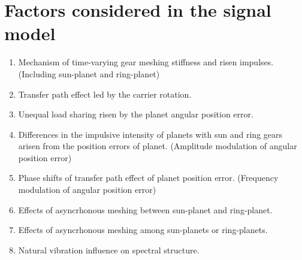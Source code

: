 \documentclass[a4paper,fleqn]{cas-sc}
\begin{document}
\section{Factors considered in the signal model}
\begin{enumerate}
    \item Mechanism of time-varying gear meshing stiffness and risen impulses. (Including sun-planet and ring-planet)
    \item Transfer path effect led by the carrier rotation.
    \item Unequal load sharing risen by the planet angular position error.
    \item Differences in the impulsive intensity of planets with sun and ring gears arisen from the position errors of planet. (Amplitude modulation of angular position error)
    \item Phase shifts of transfer path effect of planet position error. (Frequency modulation of angular position error)
    \item Effects of asyncrhonous meshing between sun-planet and ring-planet.
    \item Effects of asyncrhonous meshing among sun-planets or ring-planets.
    \item Natural vibration influence on spectral structure.
\end{enumerate}



\end{document}
